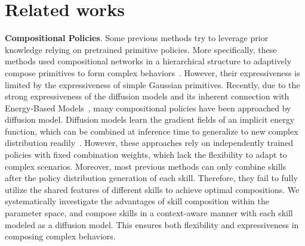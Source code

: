 \section{Related works}
\vspace{-7pt}
\label{rel_work}

\textbf{Compositional Policies}.
Some previous methods try to leverage prior knowledge relying on pretrained primitive policies. More specifically, these methods used compositional networks in a hierarchical structure to adaptively compose primitives to form complex behaviors~\citep{peng2019mcp, qureshi2020composing, pertsch2021accelerating, merel2018neural, merel2020catch}. However, their expressiveness is limited by the expressiveness of simple Gaussian primitives. 
Recently, due to the strong expressiveness of the diffusion models and its inherent connection with Energy-Based Models~\citep{lecun2006tutorial}, many compositional policies have been approached by diffusion model. Diffusion models learn the gradient fields of an implicit energy function, which can be combined at inference time to generalize to new complex distribution readily~\citep{janner2022planning, wang2024poco, du2024position, liu2022compositional, luo2024potential}. However, these approaches rely on independently trained policies with fixed combination weights, which lack the flexibility to adapt to complex scenarios. Moreover, most previous methods can only combine skills after the policy distribution generation of each skill. Therefore, they fail to fully utilize the shared features of different skills to achieve optimal compositions. 
We systematically investigate the advantages of skill composition 
within the parameter space, and compose skills in a context-aware manner with each skill modeled as a diffusion model. This ensures both flexibility and expressiveness in composing complex behaviors.

